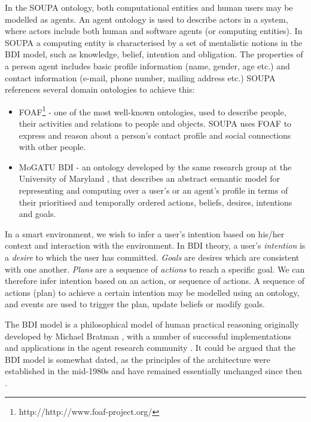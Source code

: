 In the \ac{SOUPA} ontology, both computational entities and human users may be modelled as agents. An agent ontology is used to describe actors in a system, where actors include both human and software agents (or computing entities). In \ac{SOUPA} a computing entity is characterised by a set of mentalistic notions in the \ac{BDI} model, such as knowledge, belief, intention and obligation. The properties of a person agent includes basic profile information (name, gender, age etc.) and contact information (e-mail, phone number, mailing address etc.) \ac{SOUPA} references several domain ontologies to achieve this:

\begin{itemize}
\item \ac{FOAF}\footnote{http://http://www.foaf-project.org/} - one of the most well-known ontologies, used to describe people, their activities and relations to people and objects. \ac{SOUPA} uses \ac{FOAF} to express and reason about a person's contact profile and social connections with other people.
\item MoGATU BDI - an ontology developed by the same research group at the University of Maryland \cite{Yesha2004}, that describes an abstract semantic model for representing and computing over a user's or an agent's profile in terms of their prioritised and temporally ordered actions, beliefs, desires, intentions and goals. %
\end{itemize}

In a smart environment, we wish to infer a user's intention based on his/her context and interaction with the environment. In \ac{BDI} theory, a user's \emph{intention} is a \emph{desire} to which the user has committed. \emph{Goals} are desires which are consistent with one another. \emph{Plans} are a sequence of \emph{actions} to reach a specific goal. We can therefore infer intention based on an action, or sequence of actions. A sequence of actions (plan) to achieve a certain intention may be modelled using an ontology, and events are used to trigger the plan, update beliefs or modify goals.

The \ac{BDI} model is a philosophical model of human practical reasoning originally developed by Michael Bratman \cite{Bratman1987}, with a number of successful implementations and applications in the agent research community \cite{Bratman1988, Georgeff1996}. It could be argued that the \ac{BDI} model is somewhat dated, as the principles of the architecture were established in the mid-1980s and have remained essentially unchanged since then \cite{Georgeff1999}. 

